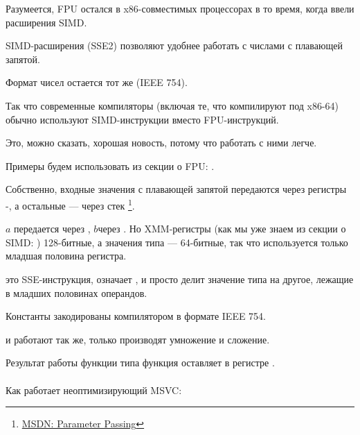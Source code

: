 
\label{floating_SIMD}
Разумеется, FPU остался в x86-совместимых процессорах в то время, когда ввели расширения \ac{SIMD}.

\ac{SIMD}-расширения (SSE2) позволяют удобнее работать с числами с плавающей запятой.

Формат чисел остается тот же (IEEE 754).

Так что современные компиляторы (включая те, что компилируют под x86-64) 
обычно используют \ac{SIMD}-инструкции вместо FPU-инструкций.

Это, можно сказать, хорошая новость, потому что работать с ними легче.

Примеры будем использовать из секции о FPU: .







Собственно, входные значения с плавающей запятой передаются через регистры -, 
а остальные --- через стек
\footnote{\href{http://go.yurichev.com/17263}{MSDN: Parameter Passing}}.

$a$ передается через , $b$\EMDASH{}через .
Но XMM-регистры (как мы уже знаем из секции о \ac{SIMD}: ) 128-битные, 
а значения типа \Tdouble --- 64-битные,
так что используется только младшая половина регистра.

 это SSE-инструкция, означает 
, 
и просто делит значение типа \Tdouble на другое, лежащие в младших половинах операндов.

Константы закодированы компилятором в формате IEEE 754.

 и  работают так же, только производят умножение и сложение.

Результат работы функции типа \Tdouble функция оставляет в регистре .\\
\\
Как работает неоптимизирующий MSVC:

